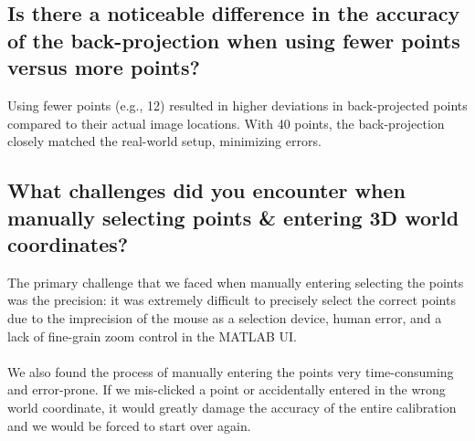 \documentclass[a4paper]{article}
\begin{document}
\subsection{Is there a noticeable difference in the accuracy of the back-projection when using fewer points versus more points?}
Using fewer points (e.g., 12) resulted in higher deviations in back-projected points compared to their actual image locations. With 40 points, the back-projection closely matched the real-world setup, minimizing errors.

\subsection{What challenges did you encounter when manually selecting points \& entering 3D world coordinates?}
The primary challenge that we faced when manually entering selecting the points was the precision: it was extremely difficult to precisely select the correct points due to the imprecision of the mouse as a selection device, human error, and a lack of fine-grain zoom control in the MATLAB UI.
\\\\
We also found the process of manually entering the points very time-consuming and error-prone.
If we mis-clicked a point or accidentally entered in the wrong world coordinate, it would greatly damage the accuracy of the entire calibration and we would be forced to start over again.
\end{document}
